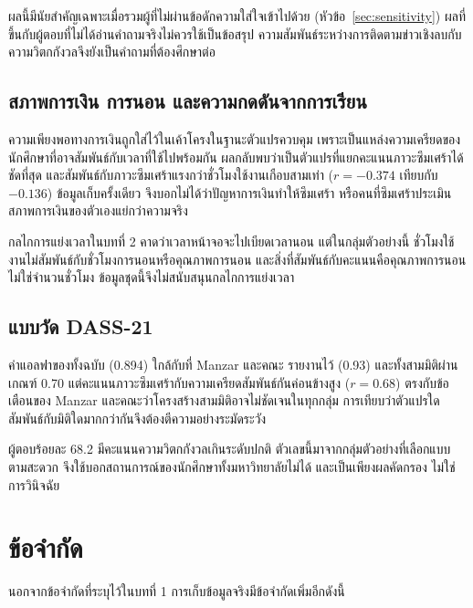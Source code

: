 ผลนี้มีนัยสำคัญเฉพาะเมื่อรวมผู้ที่ไม่ผ่านข้อดักความใส่ใจเข้าไปด้วย (หัวข้อ~\ref{sec:sensitivity})
ผลที่ขึ้นกับผู้ตอบที่ไม่ได้อ่านคำถามจริงไม่ควรใช้เป็นข้อสรุป
ความสัมพันธ์ระหว่างการติดตามข่าวเชิงลบกับความวิตกกังวลจึงยังเป็นคำถามที่ต้องศึกษาต่อ

\subsection{สภาพการเงิน การนอน และความกดดันจากการเรียน}

ความเพียงพอทางการเงินถูกใส่ไว้ในเค้าโครงในฐานะตัวแปรควบคุม
เพราะเป็นแหล่งความเครียดของนักศึกษาที่อาจสัมพันธ์กับเวลาที่ใช้ไปพร้อมกัน
ผลกลับพบว่าเป็นตัวแปรที่แยกคะแนนภาวะซึมเศร้าได้ชัดที่สุด
และสัมพันธ์กับภาวะซึมเศร้าแรงกว่าชั่วโมงใช้งานเกือบสามเท่า ($r = -0.374$ เทียบกับ $-0.136$)
ข้อมูลเก็บครั้งเดียว จึงบอกไม่ได้ว่าปัญหาการเงินทำให้ซึมเศร้า
หรือคนที่ซึมเศร้าประเมินสภาพการเงินของตัวเองแย่กว่าความจริง

กลไกการแย่งเวลาในบทที่ 2 คาดว่าเวลาหน้าจอจะไปเบียดเวลานอน
แต่ในกลุ่มตัวอย่างนี้ ชั่วโมงใช้งานไม่สัมพันธ์กับชั่วโมงการนอนหรือคุณภาพการนอน
และสิ่งที่สัมพันธ์กับคะแนนคือคุณภาพการนอน ไม่ใช่จำนวนชั่วโมง
ข้อมูลชุดนี้จึงไม่สนับสนุนกลไกการแย่งเวลา

\subsection{แบบวัด DASS-21}

ค่าแอลฟาของทั้งฉบับ (0.894) ใกล้กับที่ Manzar และคณะ \cite{manzar2025dass21} รายงานไว้ (0.93)
และทั้งสามมิติผ่านเกณฑ์ 0.70
แต่คะแนนภาวะซึมเศร้ากับความเครียดสัมพันธ์กันค่อนข้างสูง ($r = 0.68$)
ตรงกับข้อเตือนของ Manzar และคณะว่าโครงสร้างสามมิติอาจไม่ชัดเจนในทุกกลุ่ม
การเทียบว่าตัวแปรใดสัมพันธ์กับมิติใดมากกว่ากันจึงต้องตีความอย่างระมัดระวัง

ผู้ตอบร้อยละ 68.2 มีคะแนนความวิตกกังวลเกินระดับปกติ
ตัวเลขนี้มาจากกลุ่มตัวอย่างที่เลือกแบบตามสะดวก
จึงใช้บอกสถานการณ์ของนักศึกษาทั้งมหาวิทยาลัยไม่ได้ และเป็นเพียงผลคัดกรอง ไม่ใช่การวินิจฉัย

\section{ข้อจำกัด}

นอกจากข้อจำกัดที่ระบุไว้ในบทที่ 1 การเก็บข้อมูลจริงมีข้อจำกัดเพิ่มอีกดังนี้

